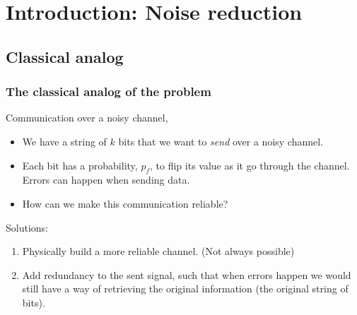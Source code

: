 \documentclass{beamer}
\renewcommand{\(}{\left(}
\renewcommand{\)}{\right)}
\renewcommand{\[}{\left[}
\renewcommand{\]}{\right]}
\begin{document}
\section{Introduction: Noise reduction}
\subsection{Classical analog}
\begin{frame}
    \frametitle{The classical analog of the problem}
    Communication over a noisy channel,
    \begin{itemize}
        \item We have a string of $k$ bits that we want to \emph{send} over a noisy channel. 
        \item Each bit has a probability, $p_f$, to flip its value as it go through the channel. Errors can happen when sending data.
        \item How can we make this communication reliable? 
    \end{itemize}
    \pause
    Solutions: 
    \begin{enumerate}
        \item Physically build a more reliable channel. (Not always possible)
        \item Add redundancy to the sent signal, such that when errors happen we would still have a way of retrieving the original information (the original string of bits).
    \end{enumerate}

\end{frame}
\end{document}
